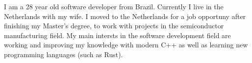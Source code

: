 \documentclass[9pt]{developercv} %
\begin{document}

\begin{minipage}[t]{0.4\textwidth} %
	\vspace{-\baselineskip} %
	I am a 28 year old software developer from Brazil. Currently I live in the Netherlands with my wife.
    I moved to the Netherlands for a job opportuny after finishing my Master's degree, to work with projects in the semiconductor manufacturing field. My main intersts in the software development field are working and improving my knowledge with modern C++ as well as learning new programming languages (such as Rust).
\end{minipage}
\hfill %
\begin{minipage}[t]{0.5\textwidth} %
	\vspace{-\baselineskip} %
	\begin{barchart}{5.5}
	\end{barchart}
\end{minipage}



\end{document}
